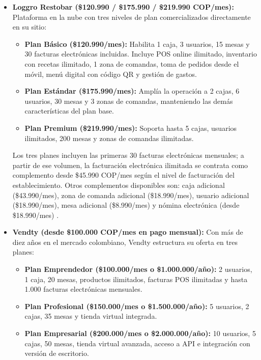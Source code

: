 \begin{itemize}
	\item \textbf{Loggro Restobar (\$120.990 / \$175.990 / \$219.990
		COP/mes):}
	Plataforma en la nube con tres niveles de plan comercializados
	directamente en su sitio:
	
	\begin{itemize}
		\item \textbf{Plan Básico (\$120.990/mes):} Habilita 1 caja,
		3 usuarios, 15 mesas y 30 facturas electrónicas incluidas. Incluye
		POS online ilimitado, inventario con recetas ilimitado, 1 zona de
		comandas, toma de pedidos desde el móvil, menú digital con código
		QR y gestión de gastos.
		\item \textbf{Plan Estándar (\$175.990/mes):} Amplía la operación
		a 2 cajas, 6 usuarios, 30 mesas y 3 zonas de comandas, manteniendo
		las demás características del plan base.
		\item \textbf{Plan Premium (\$219.990/mes):} Soporta hasta 5
		cajas, usuarios ilimitados, 200 mesas y zonas de comandas
		ilimitadas.
	\end{itemize}
	
	Los tres planes incluyen las primeras 30 facturas electrónicas
	mensuales; a partir de ese volumen, la facturación electrónica
	ilimitada se contrata como complemento desde \$45.990 COP/mes según
	el nivel de facturación del establecimiento. Otros
	complementos disponibles son: caja adicional (\$43.990/mes), zona de
	comanda adicional (\$18.990/mes), usuario adicional (\$18.990/mes),
	mesa adicional (\$8.990/mes) y nómina electrónica (desde
	\$18.990/mes) \cite{loggro_planes}.
	
	\item \textbf{Vendty (desde \$100.000 COP/mes en pago mensual):}
	Con más de diez años en el mercado colombiano, Vendty estructura su
	oferta en tres planes:
	
	\begin{itemize}
		\item \textbf{Plan Emprendedor (\$100.000/mes o \$1.000.000/año):}
		2 usuarios, 1 caja, 20 mesas, productos ilimitados, facturas POS
		ilimitadas y hasta 1.000 facturas electrónicas mensuales.
		\item \textbf{Plan Profesional (\$150.000/mes o \$1.500.000/año):}
		5 usuarios, 2 cajas, 35 mesas y tienda virtual integrada.
		\item \textbf{Plan Empresarial (\$200.000/mes o \$2.000.000/año):}
		10 usuarios, 5 cajas, 50 mesas, tienda virtual avanzada, acceso
		a API e integración con versión de escritorio.
	\end{itemize}
	

\end{itemize}
